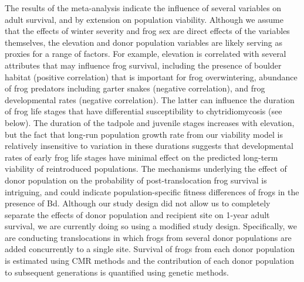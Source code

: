 \documentclass[
  letterpaper,
  DIV=11,
  numbers=noendperiod]{scrartcl}
\begin{document}
The results of the meta-analysis indicate the influence of several
variables on adult survival, and by extension on population viability.
Although we assume that the effects of winter severity and frog sex are
direct effects of the variables themselves, the elevation and donor
population variables are likely serving as proxies for a range of
factors. For example, elevation is correlated with several attributes
that may influence frog survival, including the presence of boulder
habitat (positive correlation) that is important for frog overwintering,
abundance of frog predators including garter snakes (negative
correlation), and frog developmental rates (negative correlation). The
latter can influence the duration of frog life stages that have
differential susceptibility to chytridiomycosis (see below). The
duration of the tadpole and juvenile stages increases with elevation,
but the fact that long-run population growth rate from our viability
model is relatively insensitive to variation in these durations suggests
that developmental rates of early frog life stages have minimal effect
on the predicted long-term viability of reintroduced populations. The
mechanisms underlying the effect of donor population on the probability
of post-translocation frog survival is intriguing, and could indicate
population-specific fitness differences of frogs in the presence of Bd.
Although our study design did not allow us to completely separate the
effects of donor population and recipient site on 1-year adult survival,
we are currently doing so using a modified study design. Specifically,
we are conducting translocations in which frogs from several donor
populations are added concurrently to a single site. Survival of frogs
from each donor population is estimated using CMR methods and the
contribution of each donor population to subsequent generations is
quantified using genetic methods.
\end{document}
